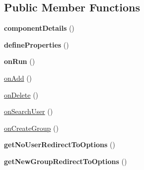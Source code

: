 \subsection*{Public Member Functions}
\begin{DoxyCompactItemize}
\item 
\hypertarget{classDMA_1_1Friends_1_1Components_1_1GroupFormCreation_aff169c7950266d239c20fb1c42cbd95a}{}{\bfseries component\+Details} ()\label{classDMA_1_1Friends_1_1Components_1_1GroupFormCreation_aff169c7950266d239c20fb1c42cbd95a}

\item 
\hypertarget{classDMA_1_1Friends_1_1Components_1_1GroupFormCreation_a9cac8a6091971e1e88d5ca104986cc31}{}{\bfseries define\+Properties} ()\label{classDMA_1_1Friends_1_1Components_1_1GroupFormCreation_a9cac8a6091971e1e88d5ca104986cc31}

\item 
\hypertarget{classDMA_1_1Friends_1_1Components_1_1GroupFormCreation_a0bee9cf0dc3a8923818d402fa3532477}{}{\bfseries on\+Run} ()\label{classDMA_1_1Friends_1_1Components_1_1GroupFormCreation_a0bee9cf0dc3a8923818d402fa3532477}

\item 
\hyperlink{classDMA_1_1Friends_1_1Components_1_1GroupFormCreation_a9dd18b90b440803a9026ac790275f804}{on\+Add} ()
\item 
\hyperlink{classDMA_1_1Friends_1_1Components_1_1GroupFormCreation_a7f4ddea881f2d0205ec7837c698e9490}{on\+Delete} ()
\item 
\hyperlink{classDMA_1_1Friends_1_1Components_1_1GroupFormCreation_a8cc5c8e020c44811c6ccdd75c7375940}{on\+Search\+User} ()
\item 
\hyperlink{classDMA_1_1Friends_1_1Components_1_1GroupFormCreation_aeddc641a6672000bcf9bcf89d338ee71}{on\+Create\+Group} ()
\item 
\hypertarget{classDMA_1_1Friends_1_1Components_1_1GroupFormCreation_a9c69342fdb9b56087dfd6ab7165e5f74}{}{\bfseries get\+No\+User\+Redirect\+To\+Options} ()\label{classDMA_1_1Friends_1_1Components_1_1GroupFormCreation_a9c69342fdb9b56087dfd6ab7165e5f74}

\item 
\hypertarget{classDMA_1_1Friends_1_1Components_1_1GroupFormCreation_adbe1bf34839afdab928e28f3043dc3b3}{}{\bfseries get\+New\+Group\+Redirect\+To\+Options} ()\label{classDMA_1_1Friends_1_1Components_1_1GroupFormCreation_adbe1bf34839afdab928e28f3043dc3b3}

\end{DoxyCompactItemize}
